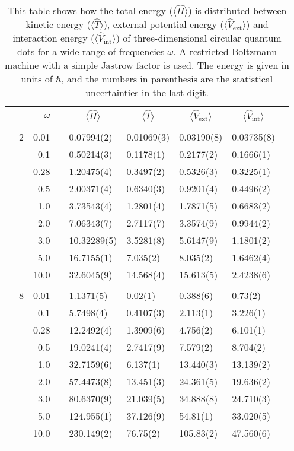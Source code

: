 \begin{table}[H]
	\caption{This table shows how the total energy ($\langle\hat{H}\rangle$) is distributed between kinetic energy ($\langle\hat{T}\rangle$), external potential energy ($\langle\hat{V}_{\text{ext}}\rangle$) and interaction energy ($\langle\hat{V}_{\text{int}}\rangle$) of three-dimensional circular quantum dots for a wide range of frequencies $\omega$. A restricted Boltzmann machine with a simple Jastrow factor is used. The energy is given in units of $\hbar$, and the numbers in parenthesis are the statistical uncertainties in the last digit.}
	\label{tab:splitfrequencyQDRBMSJ3D}
	\begin{tabularx}{\textwidth}{R{1cm}rrcR{2.3cm}R{2.3cm}R{2.3cm}R{2.3cm}R{1cm}} \hline\hline
		&\makecell{\\ \phantom{$N$} \\ \phantom{=}} & $\omega$ &&  &  &  &  \\ \hline \\
		&2 & 0.01 && 0.07994(2) & 0.01069(3) & 0.03190(8) & 0.03735(8) \\
		&& 0.1 && 0.50214(3) & 0.1178(1) & 0.2177(2) & 0.1666(1) \\
		&& 0.28 && 1.20475(4) & 0.3497(2) & 0.5326(3) & 0.3225(1) \\
		&& 0.5 && 2.00371(4) & 0.6340(3) & 0.9201(4) & 0.4496(2) \\
		&& 1.0 && 3.73543(4) & 1.2801(4) & 1.7871(5) & 0.6683(2) \\
		&& 2.0 && 7.06343(7) & 2.7117(7) & 3.3574(9) & 0.9944(2) \\
		&& 3.0 && 10.32289(5) & 3.5281(8) & 5.6147(9) & 1.1801(2) \\ 
		&& 5.0 && 16.7155(1) & 7.035(2) & 8.035(2) & 1.6462(4) \\
		&& 10.0 && 32.6045(9) & 14.568(4) & 15.613(5) & 2.4238(6) \\
		\hdashline \\
		
		&8 & 0.01 && 1.1371(5) & 0.02(1) & 0.388(6) & 0.73(2) \\
		&& 0.1 && 5.7498(4) & 0.4107(3) & 2.113(1) & 3.226(1) \\
		&& 0.28 && 12.2492(4) & 1.3909(6) & 4.756(2) & 6.101(1) \\
		&& 0.5 && 19.0241(4) & 2.7417(9) & 7.579(2) & 8.704(2) \\
		&& 1.0 && 32.7159(6) & 6.137(1) & 13.440(3) & 13.139(2) \\
		&& 2.0 && 57.4473(8) & 13.451(3) & 24.361(5) & 19.636(2) \\
		&& 3.0 && 80.6370(9) & 21.039(5) & 34.888(8) & 24.710(3) \\ 
		&& 5.0 && 124.955(1) & 37.126(9) & 54.81(1) & 33.020(5) \\
		&& 10.0 && 230.149(2) & 76.75(2) & 105.83(2) & 47.560(6) \\
		\hdashline \\
		

\end{tabularx}
\end{table}
